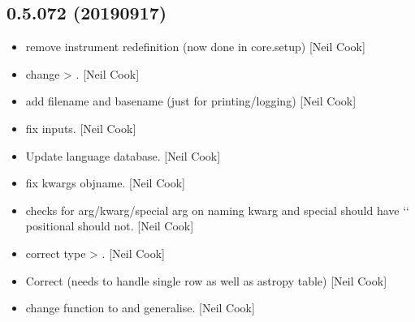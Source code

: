 \documentclass[a4paper,10pt,english]{report}
\begin{document}
\subsection{0.5.072 (2019\sphinxhyphen{}09\sphinxhyphen{}17)}
\label{\detokenize{misc/changelog:id90}}\begin{itemize}
\item {} 
 \sphinxhyphen{} remove instrument re\sphinxhyphen{}definition (now done in
core.setup) {[}Neil Cook{]}

\item {} 
 \sphinxhyphen{} change  \textendash{}\textgreater{} . {[}Neil
Cook{]}

\item {} 
 \sphinxhyphen{} add filename and basename (just for
printing/logging) {[}Neil Cook{]}

\item {} 
 \sphinxhyphen{} fix inputs. {[}Neil Cook{]}

\item {} 
Update language database. {[}Neil Cook{]}

\item {} 
 \sphinxhyphen{} fix kwargs \textendash{}objname.
{[}Neil Cook{]}

\item {} 
 \sphinxhyphen{} checks for arg/kwarg/special arg on naming
\sphinxhyphen{} kwarg and special should have ‘\sphinxhyphen{}‘ positional should not. {[}Neil Cook{]}

\item {} 
 \sphinxhyphen{} correct type  \textendash{}\textgreater{}
. {[}Neil Cook{]}

\item {} 
Correct  (needs to handle single row as well as astropy
table) {[}Neil Cook{]}

\item {} 
 \sphinxhyphen{} change function  to
 and generalise. {[}Neil Cook{]}


\end{itemize}
\end{document}
